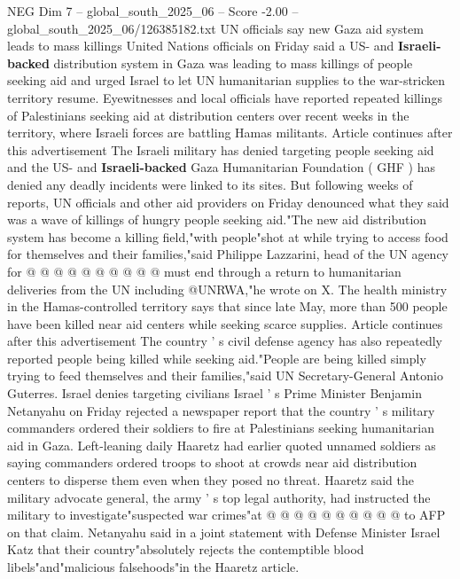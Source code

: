 \begin{textsample}{NEG Dim 7 – global\_south\_2025\_06 – Score -2.00 – global\_south\_2025\_06/126385182.txt}  \label{ex:f7_neg_055}
UN officials say new Gaza aid system leads to mass killings United Nations officials on Friday said a US- and \textbf{Israeli-backed} distribution system in Gaza was leading to mass killings of people seeking aid and urged Israel to let UN humanitarian supplies to the war-stricken territory resume.
Eyewitnesses and local officials have reported repeated killings of Palestinians seeking aid at distribution centers over recent weeks in the territory, where Israeli forces are battling Hamas militants.
Article continues after this advertisement The Israeli military has denied targeting people seeking aid and the US- and \textbf{Israeli-backed} Gaza Humanitarian Foundation ( GHF ) has denied any deadly incidents were linked to its sites.
But following weeks of reports, UN officials and other aid providers on Friday denounced what they said was a wave of killings of hungry people seeking aid."The new aid distribution system has become a killing field,"with people"shot at while trying to access food for themselves and their families,"said Philippe Lazzarini, head of the UN agency for @ @ @ @ @ @ @ @ @ @ must end through a return to humanitarian deliveries from the UN including @UNRWA,"he wrote on X.
The health ministry in the Hamas-controlled territory says that since late May, more than 500 people have been killed near aid centers while seeking scarce supplies.
Article continues after this advertisement The country ' s civil defense agency has also repeatedly reported people being killed while seeking aid."People are being killed simply trying to feed themselves and their families,"said UN Secretary-General Antonio Guterres.
Israel denies targeting civilians Israel ' s Prime Minister Benjamin Netanyahu on Friday rejected a newspaper report that the country ' s military commanders ordered their soldiers to fire at Palestinians seeking humanitarian aid in Gaza.
Left-leaning daily Haaretz had earlier quoted unnamed soldiers as saying commanders ordered troops to shoot at crowds near aid distribution centers to disperse them even when they posed no threat.
Haaretz said the military advocate general, the army ' s top legal authority, had instructed the military to investigate"suspected war crimes"at @ @ @ @ @ @ @ @ @ @ to AFP on that claim.
Netanyahu said in a joint statement with Defense Minister Israel Katz that their country"absolutely rejects the contemptible blood libels"and"malicious falsehoods"in the Haaretz article.

\end{textsample}
